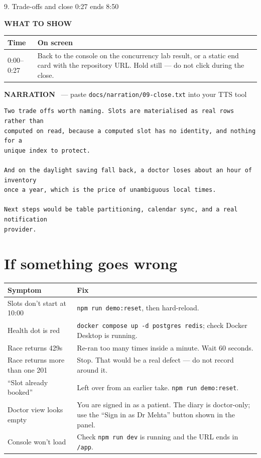 \documentclass[11pt,a4paper]{article}
\newcommand{\segbar}[3]{%
  \vspace{12pt}
  \noindent\colorbox{accent}{\parbox{\dimexpr\textwidth-2\fboxsep}{%
    \color{white}\bfseries\large\strut #1 \hfill \normalsize #2 \quad ends #3}}
  \par\vspace{7pt}}
\newcommand{\showhdr}{\noindent\textcolor{showc}{\textbf{WHAT TO SHOW}}\par\vspace{2pt}}
\newcommand{\voicehdr}[1]{\vspace{4pt}\noindent\textcolor{voice}{\textbf{NARRATION}}%
  \ \textcolor{soft}{\small --- paste \texttt{docs/narration/#1.txt} into your TTS tool}\par\vspace{2pt}}
\begin{document}
\segbar{9. Trade-offs and close}{0:27}{8:50}

\showhdr
\begin{longtable}{@{}p{1.6cm} p{13.4cm}@{}}
\toprule
\textbf{Time} & \textbf{On screen} \\
\midrule
\endhead
0:00--0:27 & Back to the console on the concurrency lab result, or a static end card
             with the repository URL. Hold still --- do not click during the close. \\
\bottomrule
\end{longtable}

\voicehdr{09-close}
\begin{lstlisting}[style=tts]
Two trade offs worth naming. Slots are materialised as real rows rather than
computed on read, because a computed slot has no identity, and nothing for a
unique index to protect.

And on the daylight saving fall back, a doctor loses about an hour of inventory
once a year, which is the price of unambiguous local times.

Next steps would be table partitioning, calendar sync, and a real notification
provider.
\end{lstlisting}

\section{If something goes wrong}

\begin{longtable}{@{}p{5.2cm} p{9.8cm}@{}}
\toprule
\textbf{Symptom} & \textbf{Fix} \\
\midrule
\endhead
Slots don't start at 10:00 & \texttt{npm run demo:reset}, then hard-reload. \\
Health dot is red & \texttt{docker compose up -d postgres redis}; check Docker Desktop is running. \\
Race returns 429s & Re-ran too many times inside a minute. Wait 60 seconds. \\
Race returns more than one 201 & Stop. That would be a real defect --- do not record around it. \\
``Slot already booked'' & Left over from an earlier take. \texttt{npm run demo:reset}. \\
Doctor view looks empty & You are signed in as a patient. The diary is doctor-only; use the ``Sign in as Dr Mehta'' button shown in the panel. \\
Console won't load & Check \texttt{npm run dev} is running and the URL ends in \texttt{/app}. \\
\bottomrule
\end{longtable}
\end{document}
